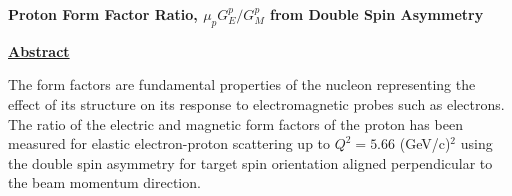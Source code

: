 \documentclass[12pt]{article}
\begin{document}
 
\pagestyle{plain}

\begin{center}
\textbf{Proton Form Factor Ratio, ${\mu_p G_E^p/G_M^p}$ from Double Spin Asymmetry} 
\end{center}

{
\raggedleft
\underline{\textbf{Abstract}}
}

The form factors are fundamental properties of the nucleon representing the effect of its structure on its response to electromagnetic probes such as electrons. The ratio of the electric and magnetic form factors of the proton has been measured for elastic electron-proton scattering up to $Q^2=5.66$ (GeV/c)$^2$ using the double spin asymmetry for target spin orientation aligned perpendicular to the beam momentum direction. 

\end{document}
